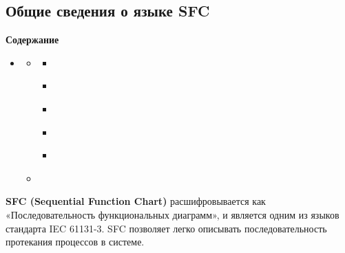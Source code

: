 \documentclass[letterpaper,10pt,russian]{sphinxmanual}
\begin{document}
\subsection{Общие сведения о языке SFC}
\label{iec_guide/sfc_guide::doc}\label{iec_guide/sfc_guide:sfc}
\begin{sphinxShadowBox}
\textbf{Содержание}

\medskip

\begin{itemize}
\item {} 
\label{iec_guide/sfc_guide:id9}{\hyperref[iec_guide/sfc_guide:sfc]{}}
\begin{itemize}
\item {} 
\label{iec_guide/sfc_guide:id10}{\hyperref[iec_guide/sfc_guide:id2]{}}
\begin{itemize}
\item {} 
\label{iec_guide/sfc_guide:id11}{\hyperref[iec_guide/sfc_guide:id3]{}}

\item {} 
\label{iec_guide/sfc_guide:id12}{\hyperref[iec_guide/sfc_guide:id4]{}}

\item {} 
\label{iec_guide/sfc_guide:id13}{\hyperref[iec_guide/sfc_guide:id5]{}}

\item {} 
\label{iec_guide/sfc_guide:id14}{\hyperref[iec_guide/sfc_guide:id6]{}}

\item {} 
\label{iec_guide/sfc_guide:id15}{\hyperref[iec_guide/sfc_guide:id7]{}}

\end{itemize}

\item {} 
\label{iec_guide/sfc_guide:id16}{\hyperref[iec_guide/sfc_guide:id8]{}}

\end{itemize}

\end{itemize}
\end{sphinxShadowBox}

\textbf{SFC (Sequential Function Chart)} расшифровывается как «Последовательность
функциональных диаграмм», и является одним из языков стандарта IEC
61131-3. SFC позволяет легко описывать последовательность протекания
процессов в системе.
\end{document}
